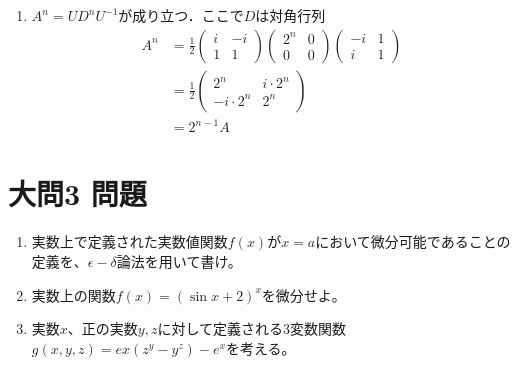\documentclass[dvipdfmx]{jsreport}
\begin{document}
\begin{souanswer}
\begin{enumerate}
\begin{equation*}
\end{equation*}
	これをみたすような$U$は$\frac{1}{\sqrt{2}}\begin{pmatrix}i& -i\\1& 1\end{pmatrix}$
	\item $A^n= UD^nU^{-1}$が成り立つ．ここで$D$は対角行列
\begin{align*}
	A^n
	&= \frac{1}{2}\begin{pmatrix}i& -i\\ 1& 1\end{pmatrix}\begin{pmatrix}2^n& 0\\ 0& 0\end{pmatrix}\begin{pmatrix}-i& 1\\ i& 1\end{pmatrix}\\
	&= \frac{1}{2}\begin{pmatrix}2^n& i\cdot 2^n\\ -i\cdot 2^n& 2^n\end{pmatrix}\\
	&= 2^{n- 1}A
\end{align*}
\end{enumerate}
\end{souanswer}
\section{大問3 問題}
\begin{tcolorbox} %
\begin{enumerate}
	\item 実数上で定義された実数値関数$f(x)$が$x= a$において微分可能であることの定義を、$\epsilon- \delta$論法を用いて書け。
	\item 実数上の関数$f(x)= (\sin{x}+ 2)^x$を微分せよ。
	\item 実数$x$、正の実数$y, z$に対して定義される3変数関数$g(x, y, z)= ex(z^y- y^z)- e^x$を考える。
\end{enumerate}
\end{tcolorbox}
\end{document}
